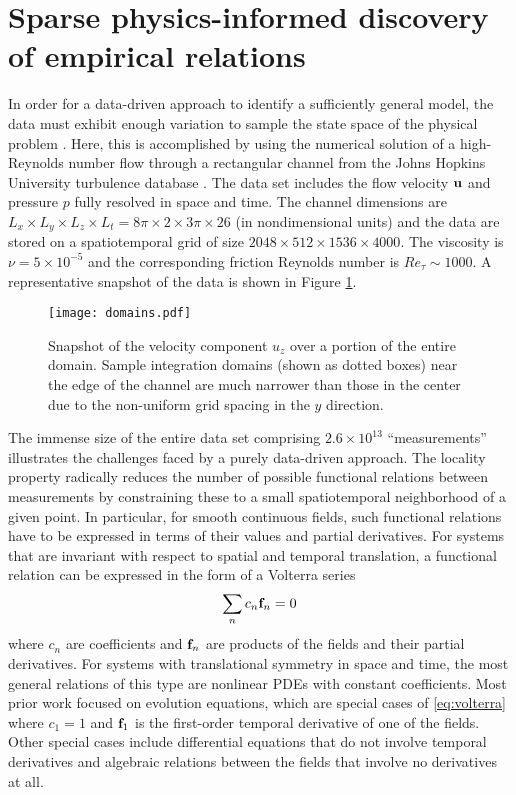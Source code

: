 \documentclass[9pt,twocolumn,twoside,lineno]{pnas-new}
\begin{document}
\section*{Sparse physics-informed discovery of empirical relations}

In order for a data-driven approach to identify a sufficiently general model, the data must exhibit enough variation to sample the state space of the physical problem \cite{schaeffer2018}. Here, this is accomplished by using the numerical solution of a high-Reynolds number flow through a rectangular channel from the Johns Hopkins University turbulence database \cite{jhutdb}. The data set includes the flow velocity ${\bf u}$ and pressure $p$ fully resolved in space and time. The channel dimensions are $L_x\times L_y\times L_z\times L_t=8\pi\times 2\times 3\pi\times 26$ (in nondimensional units) and the data are stored on a spatiotemporal grid of size $2048\times 512\times 1536\times 4000$. The viscosity is $\nu=5\times 10^{-5}$ and the corresponding friction Reynolds number is $Re_\tau \sim 1000$. A representative snapshot of the data is shown in Figure \ref{fig:domains}.

\begin{figure}[t]
\centering
\texttt{[image: domains.pdf]}
\caption{Snapshot of the velocity component $u_z$ over a portion of the entire domain. Sample integration domains (shown as dotted boxes) near the edge of the channel are much narrower than those in the center due to the non-uniform grid spacing in the $y$ direction.
}
\label{fig:domains}
\end{figure}

The immense size of the entire data set comprising $2.6\times 10^{13}$ ``measurements'' illustrates the challenges faced by a purely data-driven approach. The locality property radically reduces the number of possible functional relations between measurements by constraining these to a small spatiotemporal neighborhood of a given point. In particular, for smooth continuous fields, such functional relations have to be expressed in terms of their values and partial derivatives. For systems that are invariant with respect to spatial and temporal translation,
a functional relation can be expressed in the form of a Volterra series
\begin{equation}\label{eq:volterra}
\sum_n c_n {\bf f}_n = 0
\end{equation}
where $c_n$ are coefficients and ${\bf f}_n$ are products of the fields and their partial derivatives. For systems with translational symmetry in space and time, the most general relations of this type are nonlinear PDEs with constant coefficients. Most prior work focused on evolution equations, which are special cases of \eqref{eq:volterra} where $c_1=1$ and ${\bf f}_1$ is the first-order temporal derivative of one of the fields. Other special cases include differential equations that do not involve temporal derivatives and algebraic relations between the fields that involve no derivatives at all.
\end{document}
